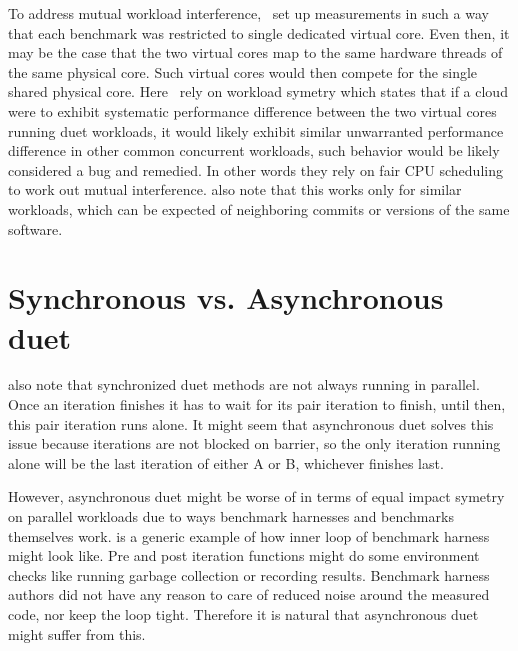 To address mutual workload interference,~\citet{bulej2020duet} set up measurements in such a way that each benchmark was restricted to single dedicated virtual core.
Even then, it may be the case that the two virtual cores map to the same hardware threads of the same physical core.
Such virtual cores would then compete for the single shared physical core.
Here~\citet{bulej2019initial} rely on workload symetry which states that if a cloud were to exhibit systematic performance difference between the two virtual cores running duet workloads, it would likely exhibit similar unwarranted performance difference in other common concurrent workloads, such behavior would be likely considered a bug and remedied.
In other words they rely on fair CPU scheduling to work out mutual interference.
\citet{bulej2019initial} also note that this works only for similar workloads, which can be expected of neighboring commits or versions of the same software.


\section{Synchronous vs. Asynchronous duet}

 also note that synchronized duet methods are not always running in parallel.
Once an iteration finishes it has to wait for its pair iteration to finish, until then, this pair iteration runs alone.
It might seem that asynchronous duet solves this issue because iterations are not blocked on barrier, so the only iteration running alone will be the last iteration of either A or B, whichever finishes last.

However, asynchronous duet might be worse of in terms of equal impact symetry on parallel workloads due to ways benchmark harnesses and benchmarks themselves work.
 is a generic example of how inner loop of benchmark harness might look like.
Pre and post iteration functions might do some environment checks like running garbage collection or recording results.
Benchmark harness authors did not have any reason to care of reduced noise around the measured code, nor keep the loop tight.
Therefore it is natural that  asynchronous duet might suffer from this.


